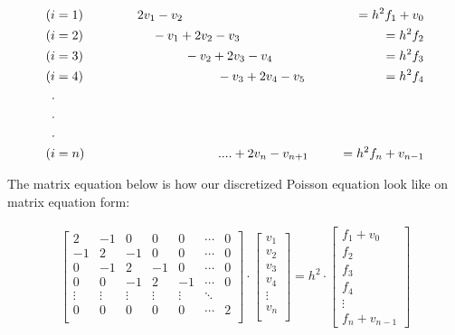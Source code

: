 \documentclass{article}
\begin{document}
\begin{center}
    \begin{align*}
    (i &= 1)\hspace{1.5cm}   2v_1 - v_2 \qquad  &= h^2f_1 +v_0 \\
    (i &= 2)\hspace{1.9cm}  -v_1 + 2v_2 - v_3 \qquad  &= h^2f_2 \\
    (i &= 3)\hspace{2.8cm}  -v_2 + 2v_3 - v_4 \qquad &= h^2f_3 \\
    (i &= 4)\hspace{3.7cm}  -v_3 + 2v_4 - v_5 \qquad &= h^2f_4 \\
    . \\
    . \\
    . \\
    (i &= n) \hspace{3.7 cm} ....  + 2v_n - v_{n+1} &= h^2f_n + v_{n-1} 
\end{align*}
\end{center}

The matrix equation below is how our discretized Poisson equation look like on matrix equation form:




    

\begin{gather}
    \begin{bmatrix}\label{likn14}
    2 & -1 & 0 & 0 & 0 &\cdots&0\\ -1 & 2 & -1 & 0 & 0 &\cdots&0\\ 0 & -1 & 2 &-1& 0 &\cdots&0 \\ 0 & 0 & -1 & 2 & -1 &\cdots&0  \\ \vdots &\vdots&\vdots&\vdots&\vdots&\ddots \\0&0&0&0&0&\cdots&2 \\
    \end{bmatrix}\cdot \begin{bmatrix}
    v_1 \\ v_2 \\ v_3 \\ v_4 \\ \vdots \\ v_n \\
    \end{bmatrix} = h^2\cdot \begin{bmatrix}
    f_1 + v_0\\f_2  \\f_3 \\f_4 \\\vdots \\ f_n + v_{n-1}
    \end{bmatrix}
\end{gather}
\end{document}
